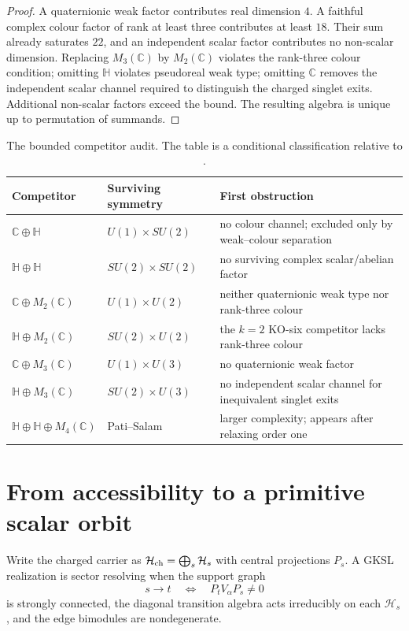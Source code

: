 \documentclass[11pt,oneside,openany]{book}
\numberwithin{equation}{chapter}
\theoremstyle{definition}
\theoremstyle{remark}
\newcommand{\C}{\mathbb C}
\newcommand{\HH}{\mathbb H}
\begin{document}
\begin{proof}
A quaternionic weak factor contributes real dimension $4$.  A faithful complex colour factor of rank at least three contributes at least $18$.  Their sum already saturates $22$, and an independent scalar factor contributes no non-scalar dimension.  Replacing $M_3(\C)$ by $M_2(\C)$ violates the rank-three colour condition; omitting $\HH$ violates pseudoreal weak type; omitting $\C$ removes the independent scalar channel required to distinguish the charged singlet exits.  Additional non-scalar factors exceed the bound.  The resulting algebra is unique up to permutation of summands.
\end{proof}

\begin{table}[ht]
\centering
\small
\begin{tabularx}{0.96\textwidth}{@{}p{}p{}X@{}}
\toprule
Competitor & Surviving symmetry & First obstruction\\
\midrule
$\C\oplus\HH$ & $U(1)\times SU(2)$ & no colour channel; excluded only by weak--colour separation\\
$\HH\oplus\HH$ & $SU(2)\times SU(2)$ & no surviving complex scalar/abelian factor\\
$\C\oplus M_2(\C)$ & $U(1)\times U(2)$ & neither quaternionic weak type nor rank-three colour\\
$\HH\oplus M_2(\C)$ & $SU(2)\times U(2)$ & the $k=2$ KO-six competitor lacks rank-three colour\\
$\C\oplus M_3(\C)$ & $U(1)\times U(3)$ & no quaternionic weak factor\\
$\HH\oplus M_3(\C)$ & $SU(2)\times U(3)$ & no independent scalar channel for inequivalent singlet exits\\
$\HH\oplus\HH\oplus M_4(\C)$ & Pati--Salam & larger complexity; appears after relaxing order one\\
\bottomrule
\end{tabularx}
\caption{The bounded competitor audit.  The table is a conditional classification relative to .}
\end{table}

\section{From accessibility to a primitive scalar orbit}
Write the charged carrier as $\mathcal H_{\rm ch}=\bigoplus_s\mathcal H_s$ with central projections $P_s$.  A GKSL realization is sector resolving when the support graph
\[
 s\to t\quad\Longleftrightarrow\quad P_tV_\alpha P_s\ne0
\]
is strongly connected, the diagonal transition algebra acts irreducibly on each $\mathcal H_s$, and the edge bimodules are nondegenerate.
\end{document}
